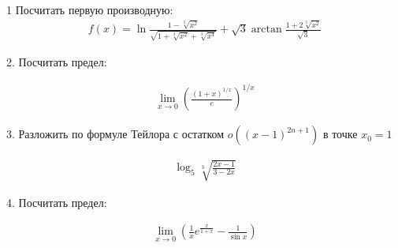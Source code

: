 \documentclass[a4paper]{report}
\begin{document}
1 Посчитать первую производную:
\begin{align*}
f(x) = \ln \frac{1-\sqrt[3]{x^2}}{\sqrt{1 + \sqrt[3]{x^2} + \sqrt[3]{x^4}}} + \sqrt{3} \arctan \frac{1 + 2\sqrt[3]{x^2}}{\sqrt{3}}
\end{align*}



2. Посчитать предел:

\begin{align*}
\lim\limits_{x \to 0} \left(\frac{(1+x)^{1/x}}{e}\right)^{1/x}
\end{align*}

3. Разложить по формуле Тейлора с остатком $o((x-1)^{2n+1})$ в точке $x_0 = 1$

\begin{align*}
\log_5 \sqrt[3]{\frac{2x - 1}{3 - 2x}}
\end{align*}

4. Посчитать предел:

\begin{align*}
\lim\limits_{x \to 0}\left(\frac{1}{x}e^{\frac{x}{1+x}} - \frac{1}{\sin x}\right)
\end{align*}
\end{document}
